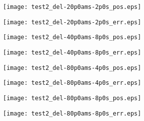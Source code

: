 \begin{figure}
    \centering
    \texttt{[image: test2\_del-20p0ams-2p0s\_pos.eps]}
\end{figure}
\begin{figure}
    \centering
    \texttt{[image: test2\_del-20p0ams-2p0s\_err.eps]}
\end{figure}
\begin{figure}
    \centering
    \texttt{[image: test2\_del-40p0ams-8p0s\_pos.eps]}
\end{figure}
\begin{figure}
    \centering
    \texttt{[image: test2\_del-40p0ams-8p0s\_err.eps]}
\end{figure}
\clearpage
\begin{figure}
    \centering
    \texttt{[image: test2\_del-80p0ams-4p0s\_pos.eps]}
\end{figure}
\begin{figure}
    \centering
    \texttt{[image: test2\_del-80p0ams-4p0s\_err.eps]}
\end{figure}
\begin{figure}
    \centering
    \texttt{[image: test2\_del-80p0ams-8p0s\_pos.eps]}
\end{figure}
\begin{figure}
    \centering
    \texttt{[image: test2\_del-80p0ams-8p0s\_err.eps]}
\end{figure}
\clearpage
